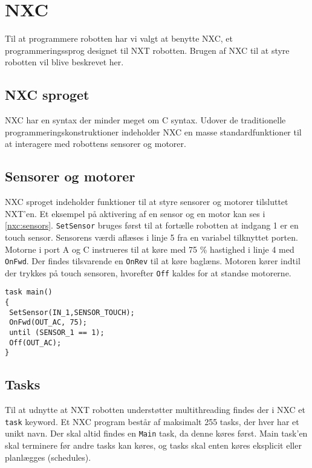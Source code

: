 \section{NXC}
Til at programmere robotten har vi valgt at benytte NXC, et programmeringssprog designet til NXT robotten. 
Brugen af NXC til at styre robotten vil blive beskrevet her. \cite{NXC}

\subsection{NXC sproget}
NXC har en syntax der minder meget om C syntax. 
Udover de traditionelle programmeringskonstruktioner indeholder NXC en masse standardfunktioner til at interagere med robottens sensorer og motorer.

\subsection{Sensorer og motorer}
NXC sproget indeholder funktioner til at styre sensorer og motorer tilsluttet NXT'en.
Et eksempel på aktivering af en sensor og en motor kan ses i \cref{nxc:sensors}.
\lstinline[style=c]!SetSensor! bruges først til at fortælle robotten at indgang 1 er en touch sensor. 
Sensorens værdi aflæses i linje 5 fra en variabel tilknyttet porten.
Motorne i port A og C instrueres til at køre med 75 \% hastighed i linje 4 med \lstinline[style=c]!OnFwd!.  
Der findes tilsvarende en \lstinline[style=c]!OnRev! til at køre baglæns.
Motoren kører indtil der trykkes på touch sensoren, hvorefter \lstinline[style=c]!Off! kaldes for at standse motorerne.

\begin{lstlisting}[style=c,label=nxc:sensors, caption={Brug af motorer og sensorer}]
task main()
{
 SetSensor(IN_1,SENSOR_TOUCH);
 OnFwd(OUT_AC, 75);
 until (SENSOR_1 == 1);
 Off(OUT_AC);
}
\end{lstlisting}

\subsection{Tasks}
Til at udnytte at NXT robotten understøtter multithreading findes der i NXC et \lstinline[style=c]!task! keyword.
Et NXC program består af maksimalt 255 tasks, der hver har et unikt navn. 
Der skal altid findes en \lstinline[style=c]!Main! task, da denne køres først.
Main task'en skal terminere før andre tasks kan køres, og tasks skal enten køres eksplicit eller planlægges (schedules).

